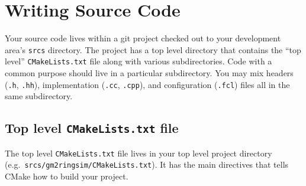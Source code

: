 \chapter{Writing Source Code}

Your source code lives within a git project checked out to your
development area's \texttt{srcs} directory. The project has a top
level directory that contains the ``top level''
\texttt{CMakeLists.txt} file along with various subdirectories. Code
with a common purpose should live in a particular
subdirectory.
You may mix headers (\texttt{.h}, \texttt{.hh}), implementation
(\texttt{.cc}, \texttt{.cpp}), and configuration (\texttt{.fcl}) files
all in the same subdirectory.

\section{Top level \texttt{CMakeLists.txt} file}
\label{sec:toplevelcmake}

The top level \texttt{CMakeLists.txt} file lives in your top level project directory (e.g.\ \texttt{srcs/gm2ringsim/CMakeLists.txt}). It has the main directives that tells CMake how to build your project. 

